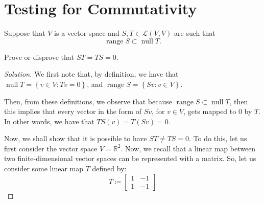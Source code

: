 \documentclass{article}
\newenvironment{solution}{\begin{proof}[Solution]}{\end{proof}}
\newcommand{\RR}{\mathbb{R}}
\DeclareMathOperator*{\vnull}{\mathrm{null}}
\DeclareMathOperator*{\vrange}{\mathrm{range}}
\begin{document}
	\section{Testing for Commutativity}
	\begin{hw}
		Suppose that $V$ is a vector space and $S, T \in \mathcal L(V,V)$ are such that
		\begin{equation*}
			\vrange S \subset \vnull T.
		\end{equation*}
	
		Prove or disprove that $ST = TS = 0$.
	\end{hw}
	\begin{solution}
		\begin{comment}
		We first note that $\vnull T = \left\{  v \in V : Tv = 0 \right\}$, and $\vrange S = \left\{  Sv : v \in V \right\}$.
		
		In other words, $\vnull T$ is the set of vectors $v$ that gets mapped to 0, and $S$ is the set of vectors of the form $Sv$ in $V$.
		
		We observe here that because $\vrange S \subset \vnull T$, this implies then that the set of vectors $Sv$ are also ones where $T(Sv) = 0$. Then, we observe that $T(Sv) = 0$.
		
		Now, we observe that $ST(v) = S(T(v))$. $TS(v) = $
		\end{comment}
		We first note that, by definition, we have that $\vnull T = \left\{  v \in V : Tv = 0\right\}$, and $\vrange S = \left\{  Sv : v \in V \right\}$.
	
		Then, from these definitions, we observe that because $\vrange S \subset \vnull T$, then this implies that every vector in the form of $Sv$, for $v \in V$, gets mapped to $0$ by $T$. In other words, we have that $TS(v) = T(Sv) = 0$.
		
		Now, we shall show that it is possible to have $ST \not= TS = 0$. To do this, let us first consider the vector space $V = \RR^{2}$. Now, we recall that a linear map between two finite-dimensional vector spaces can be represented with a matrix. So, let us consider some linear map $T$ defined by:
		\begin{equation*} T \coloneq
			\begin{bmatrix}
				1 & -1 \\
				1 & -1
			\end{bmatrix}
		\end{equation*}
	

\end{solution}
\end{document}
